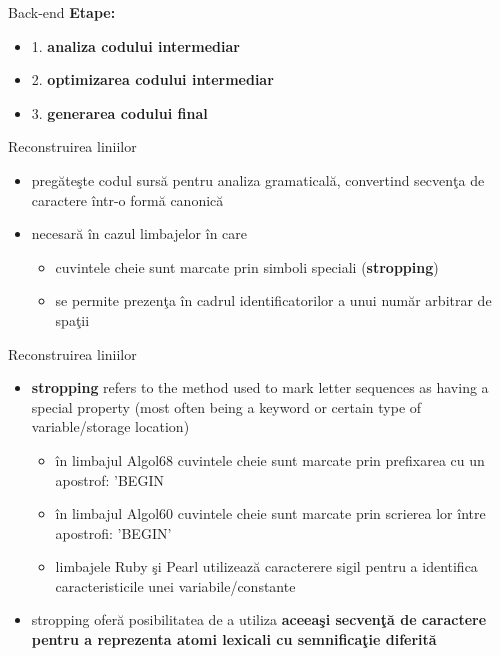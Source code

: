 \documentclass[pdf]{beamer}
\begin{document}
\begin{frame}{Back-end }
\textbf{Etape:}
\begin{itemize}
\item
1. \textbf{analiza codului intermediar}
\item
2. \textbf{optimizarea codului intermediar}
\item
3. \textbf{generarea codului final}
\end{itemize}
\end{frame}



\begin{frame}{Reconstruirea liniilor}
\begin{itemize}
\item
pregăteşte codul sursă pentru analiza gramaticală, convertind secvenţa de caractere într-o formă canonică

\item
necesară în cazul limbajelor în care 
\begin{itemize}
\item
cuvintele cheie sunt marcate prin simboli speciali (\textbf{stropping})
\item
se permite prezenţa în cadrul identificatorilor a unui număr arbitrar de spaţii
\end{itemize}
\end{itemize}
\end{frame}



\begin{frame}{Reconstruirea liniilor}
\begin{itemize}
\item
\textbf{stropping} refers to the method used to mark letter sequences as having a special property (most often being a keyword or certain type of variable/storage location)

\begin{itemize}
\item
în limbajul Algol68 cuvintele cheie sunt marcate prin prefixarea cu un apostrof: 'BEGIN
\item
în limbajul Algol60 cuvintele cheie sunt marcate prin scrierea lor între apostrofi: 'BEGIN'
\item
limbajele Ruby şi Pearl utilizează caracterere sigil pentru a identifica caracteristicile unei variabile/constante
\end{itemize}

\item
stropping oferă posibilitatea de a utiliza \textbf{aceeaşi secvenţă de caractere pentru a reprezenta atomi lexicali cu semnificaţie diferită}

\end{itemize}
\end{frame}
\end{document}

